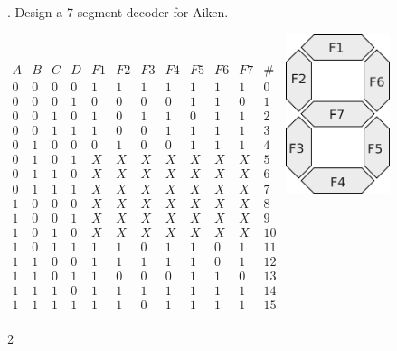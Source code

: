 \documentclass[12pt]{book}
\newenvironment{indented}[1] {
	\begin{list}{}{\setlength{\leftmargin}{#1}}
		\item[]
	}{\end{list}}
\begin{document}
	\pagebreak

	. Design a 7-segment decoder for Aiken.
	\begin{indented}{5mm}
		$\begin{array}{c|c|c|c||c|c|c|c|c|c|c||c}
			A & B & C & D & F1 & F2 & F3 & F4 & F5 & F6 & F7 & \#\\
			\hline
			0 & 0 & 0 & 0 & 1 & 1 & 1 & 1 & 1 & 1 & 1 & 0\\ %
			0 & 0 & 0 & 1 & 0 & 0 & 0 & 0 & 1 & 1 & 0 & 1\\ %
			0 & 0 & 1 & 0 & 1 & 0 & 1 & 1 & 0 & 1 & 1 & 2\\ %
			0 & 0 & 1 & 1 & 1 & 0 & 0 & 1 & 1 & 1 & 1 & 3\\ %
			0 & 1 & 0 & 0 & 0 & 1 & 0 & 0 & 1 & 1 & 1 & 4\\ %
			0 & 1 & 0 & 1 & X & X & X & X & X & X & X & 5\\ %
			0 & 1 & 1 & 0 & X & X & X & X & X & X & X & 6\\ %
			0 & 1 & 1 & 1 & X & X & X & X & X & X & X & 7\\ %
			1 & 0 & 0 & 0 & X & X & X & X & X & X & X & 8\\ %
			1 & 0 & 0 & 1 & X & X & X & X & X & X & X & 9\\ %
			1 & 0 & 1 & 0 & X & X & X & X & X & X & X & 10\\ %
			1 & 0 & 1 & 1 & 1 & 1 & 0 & 1 & 1 & 0 & 1 & 11\\ %
			1 & 1 & 0 & 0 & 1 & 1 & 1 & 1 & 1 & 0 & 1 & 12\\ %
			1 & 1 & 0 & 1 & 1 & 0 & 0 & 0 & 1 & 1 & 0 & 13\\ %
			1 & 1 & 1 & 0 & 1 & 1 & 1 & 1 & 1 & 1 & 1 & 14\\ %
			1 & 1 & 1 & 1 & 1 & 1 & 0 & 1 & 1 & 1 & 1 & 15\\ %
		\end{array}$
		\includegraphics[width=1.2in]{7-segment-display}
		
		\begin{multicols}{2}
			\begin{karnaugh-map}[4][4][1][(F1) \ CD][AB]
				

\end{karnaugh-map}
\end{multicols}
\end{indented}
\end{document}
